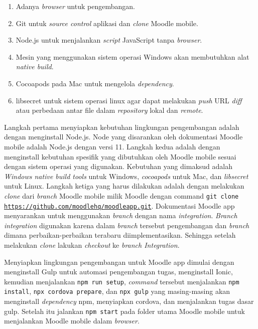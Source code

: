 \begin{enumerate}
	\item Adanya \textit{browser} untuk pengembangan.
	\item Git untuk \textit{source control} aplikasi dan \textit{clone} Moodle mobile.
	\item Node.js untuk menjalankan \textit{script} JavaScript tanpa \textit{browser}.
	\item Mesin yang menggunakan sistem operasi Windows akan membutuhkan alat \textit{native build}.
	\item Cocoapods pada Mac untuk mengelola \textit{dependency}.
	\item libsecret untuk sistem operasi linux agar dapat melakukan \textit{push} URL \textit{diff} atau perbedaan antar file dalam \textit{repository} lokal dan \textit{remote}.
	
\end{enumerate}

Langkah pertama menyiapkan kebutuhan lingkungan pengembangan adalah dengan menginstall Node.js. Node yang disarankan oleh dokumentasi Moodle mobile adalah Node.js dengan versi 11\cite{moodle:dev}. Langkah kedua adalah dengan menginstall kebutuhan spesifik yang dibutuhkan oleh Moodle mobile sesuai dengan sistem operasi yang digunakan. Kebutuhan yang dimaksud adalah \textit{Windows native build tools} untuk Windows, \textit{cocoapods} untuk Mac, dan \textit{libsecret} untuk Linux. Langkah ketiga yang harus dilakukan adalah dengan melakukan \textit{clone} dari \textit{branch} Moodle mobile milik Moodle dengan command  \texttt{git clone \url{https://github.com/moodlehq/moodleapp.git}}. Dokumentasi Moodle app menyarankan untuk menggunakan \textit{branch} dengan nama \textit{integration}\cite{moodle:dev}. \textit{Branch integration} digunakan karena dalam \textit{branch} tersebut pengembangan dan \textit{branch} dimana perbaikan-perbaikan terabaru diimplementasikan. Sehingga setelah melakukan \textit{clone} lakukan \textit{checkout} ke \textit{branch Integration}.


Menyiapkan lingkungan pengembangan untuk Moodle app dimulai dengan menginstall Gulp untuk automasi pengembangan tugas, menginstall Ionic, kemudian menjalankan \texttt{npm run setup}, \textit{command} tersebut menjalankan \texttt{npm install}, \texttt{npx cordova prepare}, dan \texttt{npx gulp} yang masing-masing akan menginstall \textit{dependency} npm, menyiapkan cordova, dan menjalankan tugas dasar gulp. Setelah itu jalankan \texttt{npm start} pada folder utama Moodle mobile untuk menjalankan Moodle mobile dalam \textit{browser}.

